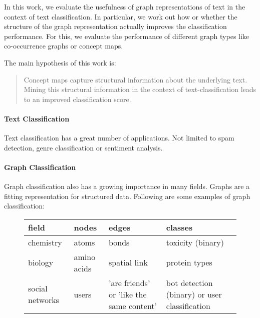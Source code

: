 
In this work, we evaluate the usefulness of graph representations of text in the context of text classification. In particular, we work out how or whether the structure of the graph representation actually improves the classification performance.
For this, we evaluate the performance of different graph types like co-occurrence graphs or concept maps.

The main hypothesis of this work is:
\begin{quote}
Concept maps capture structural information about the underlying text. Mining this structural information in the context of text-classification leads to an improved classification score.
\end{quote}

\paragraph{Text Classification}
Text classification has a great number of applications. Not limited to spam detection, genre classification or sentiment analysis.

\paragraph{Graph Classification}
Graph classification also has a growing importance in many fields. Graphs are a fitting representation for structured data. Following are some examples of graph classification:

\begin{figure}[h]
\centering
\begin{tabular}{llll}
field &  nodes &  edges & classes\\
\midrule
chemistry & atoms & bonds & toxicity (binary)\\
biology & amino acids & spatial link & protein types \\ 
social networks & users & 'are friends' or 'like the same content' & bot detection (binary) or user classification
\end{tabular}
\end{figure}

